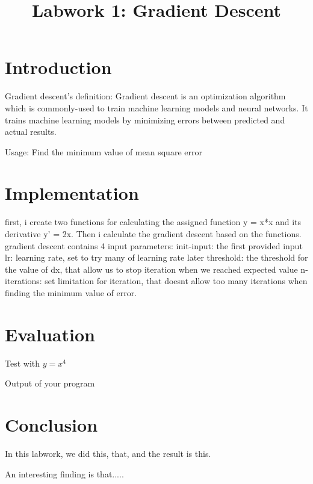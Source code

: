 \documentclass{article}
\title{Labwork 1: Gradient Descent}
\begin{document}
\maketitle

\setlength\parindent{0pt}

\section{Introduction}

Gradient descent's definition: Gradient descent is an optimization algorithm which is commonly-used to train machine learning models and neural networks. It trains machine learning models by minimizing errors between predicted and actual results.

Usage: Find the minimum value of mean square error

\section{Implementation}

first, i create two functions  for calculating the assigned function y = x*x and its derivative  y' = 2x.
Then i calculate the gradient descent based on the functions.
gradient descent contains 4 input parameters:
init-input: the first provided input 
lr: learning rate, set to try many of learning rate later
threshold: the threshold for the value of dx, that allow us to stop iteration when we reached expected value
n-iterations: set limitation for iteration, that doesnt allow too many iterations when finding the minimum value of error.


\section{Evaluation}

Test with $y = x^4$

Output of your program

\section{Conclusion}

In this labwork, we did this, that, and the result is this.

An interesting finding is that.....
\end{document}
